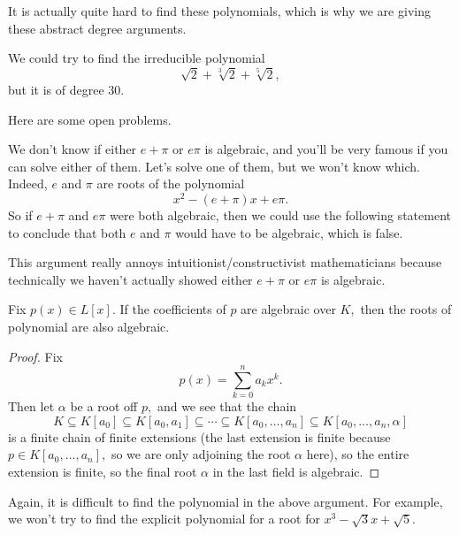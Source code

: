 It is actually quite hard to find these polynomials, which is why we are giving these abstract degree arguments.
\begin{example}
	We could try to find the irreducible polynomial
	\[\sqrt2+\sqrt[3]2+\sqrt[5]2,\]
	but it is of degree $30.$
\end{example}
Here are some open problems.
\begin{example}
	We don't know if either $e+\pi$ or $e\pi$ is algebraic, and you'll be very famous if you can solve either of them. Let's solve one of them, but we won't know which. Indeed, $e$ and $\pi$ are roots of the polynomial
	\[x^2-(e+\pi)x+e\pi.\]
	So if $e+\pi$ and $e\pi$ were both algebraic, then we could use the following statement to conclude that both $e$ and $\pi$ would have to be algebraic, which is false.
\end{example}
\begin{remark}
	This argument really annoys intuitionist/constructivist mathematicians because technically we haven't actually showed either $e+\pi$ or $e\pi$ is algebraic.
\end{remark}
\begin{proposition}
	Fix $p(x)\in L[x].$ If the coefficients of $p$ are algebraic over $K,$ then the roots of polynomial are also algebraic.
\end{proposition}
\begin{proof}
	Fix
	\[p(x)=\sum_{k=0}^na_kx^k.\]
	Then let $\alpha$ be a root off $p,$ and we see that the chain
	\[K\subseteq K[a_0]\subseteq K[a_0,a_1]\subseteq\cdots\subseteq K[a_0,\ldots,a_n]\subseteq K[a_0,\ldots,a_n,\alpha]\]
	is a finite chain of finite extensions (the last extension is finite because $p\in K[a_0,\ldots,a_n],$ so we are only adjoining the root $\alpha$ here), so the entire extension is finite, so the final root $\alpha$ in the last field is algebraic.
\end{proof}
\begin{remark}
	Again, it is difficult to find the polynomial in the above argument. For example, we won't try to find the explicit polynomial for a root for $x^3-\sqrt3 x+\sqrt 5.$
\end{remark}

